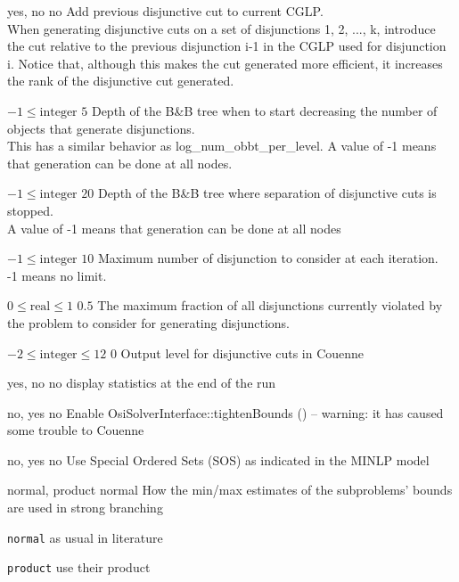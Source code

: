 %
{\ttfamily yes, no}%
{no}%
{Add previous disjunctive cut to current CGLP.\\
When generating disjunctive cuts on a set of disjunctions 1, 2, ..., k, introduce the cut relative to the previous disjunction i-1 in the CGLP used for disjunction i. Notice that, although this makes the cut generated more efficient, it increases the rank of the disjunctive cut generated.}%
{}

%
{$-1\leq\textrm{integer}$}%
{$5$}%
{Depth of the B\&B tree when to start decreasing the number of objects that generate disjunctions.\\
This has a similar behavior as log\_num\_obbt\_per\_level. A value of -1 means that generation can be done at all nodes.}%
{}

%
{$-1\leq\textrm{integer}$}%
{$20$}%
{Depth of the B\&B tree where separation of disjunctive cuts is stopped.\\
A value of -1 means that generation can be done at all nodes}%
{}

%
{$-1\leq\textrm{integer}$}%
{$10$}%
{Maximum number of disjunction to consider at each iteration.\\
-1 means no limit.}%
{}

%
{$0\leq\textrm{real}\leq1$}%
{$0.5$}%
{The maximum fraction of all disjunctions currently violated by the problem to consider for generating disjunctions.}%
{}

%
{$-2\leq\textrm{integer}\leq12$}%
{$0$}%
{Output level for disjunctive cuts in Couenne}%
{}

%
{\ttfamily yes, no}%
{no}%
{display statistics at the end of the run}%
{}

%
{\ttfamily no, yes}%
{no}%
{Enable OsiSolverInterface::tightenBounds () -- warning: it has caused some trouble to Couenne}%
{}

%
{\ttfamily no, yes}%
{no}%
{Use Special Ordered Sets (SOS) as indicated in the MINLP model}%
{}

%
{\ttfamily normal, product}%
{normal}%
{How the min/max estimates of the subproblems' bounds are used in strong branching}%
{\begin{list}{}{
\setlength{\parsep}{0em}
\setlength{\leftmargin}{5ex}
\setlength{\labelwidth}{2ex}
\setlength{\itemindent}{0ex}
\setlength{\topsep}{0pt}}
\item[\texttt{normal}] as usual in literature
\item[\texttt{product}] use their product
\end{list}
}

